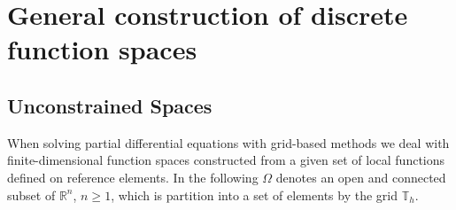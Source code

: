 \section{General construction of discrete function spaces}\label{Sec:General}

\subsection{Unconstrained Spaces}

When solving partial differential equations with grid-based
methods we deal with finite-dimensional function spaces constructed
from a given set of local functions defined on reference elements.
In the following $\Omega$ denotes an open and connected subset of
$\mathbb{R}^n$, $n\geq 1$, which is partition into a set of elements by the grid
$\mathbb{T}_h$.

